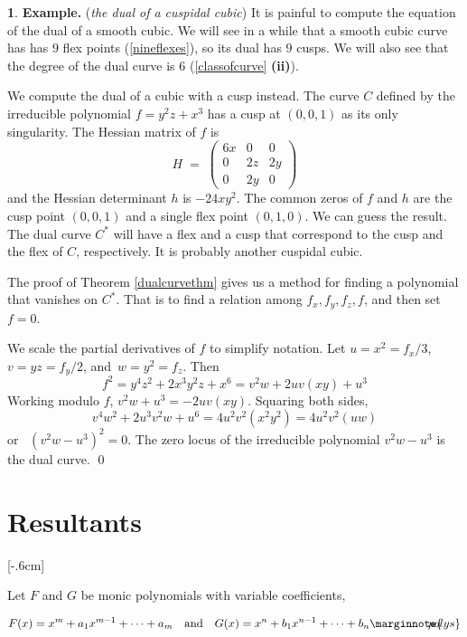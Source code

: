 \documentclass[leqno]{book}
\newcommand\Marginnote[1]{\marginnote{\hspace{-12pt}\normalfont{#1}}}
\theoremstyle{definition}%
\numberwithin{equation}{section}
\newtheorem{example}[equation]{}
\theoremstyle{theorem} %
\begin{document}
 \begin{example}{\bf Example.}\Marginnote{cuspcubic}\;
({\it the dual of a cuspidal cubic}) It is painful to compute the
   equation of the dual of a smooth cubic.  We will see in a while
   that a smooth cubic curve has has $9$ flex points
   (\ref{nineflexes}), so its dual  has $9$ cusps.  We will also
   see that the degree of the dual curve is $6$ (\ref{classofcurve} {\bf
     (ii)}).

   We compute the dual of a cubic with a cusp instead.
   The curve $C$ defined by the irreducible polynomial $f = y^2z+x^3$
   has a cusp at $(0,0,1)$ as its only singularity.  The Hessian
   matrix of $f$ is
$$H \;=\; \begin{pmatrix} 6x & 0 & 0\\ 0 & 2z & 2y\\ 0 & 2y & 0
\end{pmatrix}$$ 
and the Hessian determinant $h$ is $-24 xy^2$.  The common zeros of $f$
and $h$ are the cusp point $(0,0,1)$ and a single flex point
$(0,1,0)$.  We can guess the result.  The dual curve $C^*$ will have
a flex and a cusp  that  correspond to the cusp and the flex of $C$,
respectively.  It is probably  another cuspidal cubic.


The proof of Theorem \ref{dualcurvethm} gives us a method for finding
a polynomial that vanishes on $C^*$.  That is to find a relation among
$f_x,f_y,f_z,f$, and then set $f=0$.

We scale the partial derivatives of $f$ to simplify notation.  Let $u
= x^2 = f_x/3$, \,$v= yz = f_y/2$, and \,$w = y^2 = f_z$.  
Then
$$f^2 = y^4z^2 + 2x^3y^2z + x^6 = v^2w + 2uv(xy) + u^3$$ Working
modulo $f$, \; $v^2w+u^3 = - 2uv(xy)$.  Squaring both sides, $$
v^4w^2 + 2u^3v^2w + u^6= 4u^2v^2(x^2y^2) = 4u^2v^2(uw)$$ or \, $(v^2w -
u^3)^2 = 0$.  The  zero locus of the irreducible polynomial
$v^2w-u^3$ is the dual curve. \qed\label{cuspcubic} \end{example}


 \section{Resultants}
\label{resultant}\Marginnote{resultant}[-.6cm]

\ms Let $F$ and $G$ be monic polynomials
with variable coefficients,

\begin{equation}
F(x) = x^m+a_1x^{m-1}+\cdots + a_m \quad \text{and}\quad G(x) = x^n+
 b_1x^{n-1}+\cdots + b_n\Marginnote{polys}\label{polys}
\end{equation}  
\end{document}
